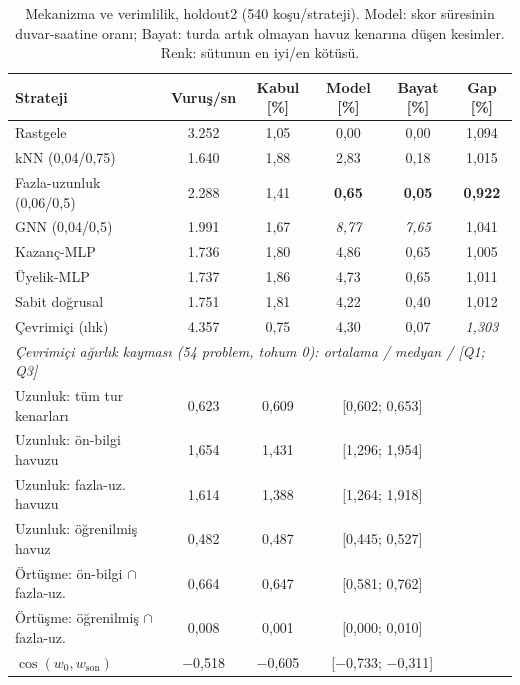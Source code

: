 \documentclass[pdflatex,sn-basic]{sn-jnl}
\newcommand{\iyi}[1]{\textcolor{iyiRenk}{\textbf{#1}}}
\newcommand{\kotu}[1]{\textcolor{kotuRenk}{\textit{#1}}}
\begin{document}
\begin{table}[!htbp]
\centering\small\setlength{\tabcolsep}{3pt}
\caption{Mekanizma ve verimlilik, holdout2 (540 koşu/strateji). Model: skor süresinin duvar-saatine oranı; Bayat: turda artık olmayan havuz kenarına düşen kesimler. Renk: sütunun en iyi/en kötüsü.}
\label{tab:v3-mechanism}
\begin{tabular*}{\textwidth}{@{\extracolsep{\fill}}lccccc}
\toprule
Strateji & Vuruş/sn & Kabul [\%] & Model [\%] & Bayat [\%] & Gap [\%] \\
\midrule
Rastgele & 3.252 & 1{,}05 & 0{,}00 & 0{,}00 & 1{,}094 \\
kNN (0,04/0,75) & 1.640 & 1{,}88 & 2{,}83 & 0{,}18 & 1{,}015 \\
Fazla-uzunluk (0,06/0,5) & 2.288 & 1{,}41 & \iyi{0{,}65} & \iyi{0{,}05} & \iyi{0{,}922} \\
GNN (0,04/0,5) & 1.991 & 1{,}67 & \kotu{8{,}77} & \kotu{7{,}65} & 1{,}041 \\
Kazanç-MLP & 1.736 & 1{,}80 & 4{,}86 & 0{,}65 & 1{,}005 \\
Üyelik-MLP & 1.737 & 1{,}86 & 4{,}73 & 0{,}65 & 1{,}011 \\
Sabit doğrusal & 1.751 & 1{,}81 & 4{,}22 & 0{,}40 & 1{,}012 \\
Çevrimiçi (ılık) & 4.357 & 0{,}75 & 4{,}30 & 0{,}07 & \kotu{1{,}303} \\
\midrule
\multicolumn{6}{l}{\textit{Çevrimiçi ağırlık kayması (54 problem, tohum 0): ortalama / medyan / [Q1; Q3]}} \\
\quad Uzunluk: tüm tur kenarları & 0{,}623 & 0{,}609 & \multicolumn{2}{c}{[0{,}602; 0{,}653]} & \\
\quad Uzunluk: ön-bilgi havuzu & 1{,}654 & 1{,}431 & \multicolumn{2}{c}{[1{,}296; 1{,}954]} & \\
\quad Uzunluk: fazla-uz. havuzu & 1{,}614 & 1{,}388 & \multicolumn{2}{c}{[1{,}264; 1{,}918]} & \\
\quad Uzunluk: öğrenilmiş havuz & 0{,}482 & 0{,}487 & \multicolumn{2}{c}{[0{,}445; 0{,}527]} & \\
\quad Örtüşme: ön-bilgi $\cap$ fazla-uz. & 0{,}664 & 0{,}647 & \multicolumn{2}{c}{[0{,}581; 0{,}762]} & \\
\quad Örtüşme: öğrenilmiş $\cap$ fazla-uz. & 0{,}008 & 0{,}001 & \multicolumn{2}{c}{[0{,}000; 0{,}010]} & \\
\quad $\cos(w_0, w_{\text{son}})$ & $-$0{,}518 & $-$0{,}605 & \multicolumn{2}{c}{[$-$0{,}733; $-$0{,}311]} & \\
\bottomrule
\end{tabular*}
\end{table}
\end{document}
